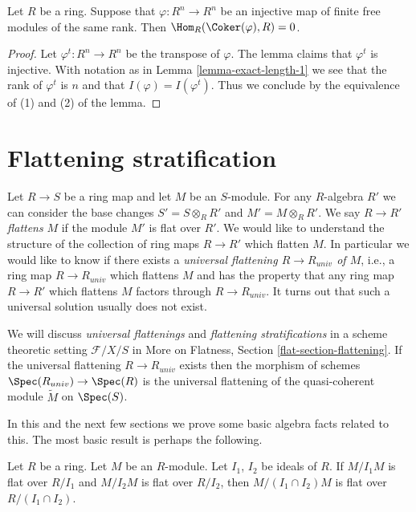 \begin{lemma}
\label{lemma-coker-injective-free}
Let $R$ be a ring. Suppose that $\varphi : R^n \to R^n$ be an injective
map of finite free modules of the same rank. Then
$\Hom_R(\Coker(\varphi), R) = 0$.
\end{lemma}

\begin{proof}
Let $\varphi^t : R^n \to R^n$ be the transpose of $\varphi$.
The lemma claims that $\varphi^t$ is injective.
With notation as in Lemma \ref{lemma-exact-length-1}
we see that the rank of $\varphi^t$ is $n$ and that
$I(\varphi) = I(\varphi^t)$. Thus we conclude by
the equivalence of (1) and (2) of the lemma.
\end{proof}









\section{Flattening stratification}
\label{section-flattening}

\noindent
Let $R \to S$ be a ring map and let $M$ be an $S$-module.
For any $R$-algebra $R'$ we can consider the base changes
$S' = S \otimes_R R'$ and $M' = M \otimes_R R'$.
We say $R \to R'$ {\it flattens} $M$ if the module $M'$ is flat over $R'$.
We would like to understand the structure of the collection of ring maps
$R \to R'$ which flatten $M$. In particular we would like to know
if there exists a {\it universal flattening $R \to R_{univ}$ of $M$},
i.e., a ring map $R \to R_{univ}$ which flattens $M$ and has the property
that any ring map $R \to R'$ which flattens $M$ factors through
$R \to R_{univ}$. It turns out that such a universal solution usually
does not exist.

\medskip\noindent
We will discuss {\it universal flattenings} and
{\it flattening stratifications} in a scheme theoretic
setting $\mathcal{F}/X/S$ in
More on Flatness, Section \ref{flat-section-flattening}.
If the universal flattening $R \to R_{univ}$ exists then the
morphism of schemes $\Spec(R_{univ}) \to \Spec(R)$ is the
universal flattening of the quasi-coherent module
$\widetilde{M}$ on $\Spec(S)$.

\medskip\noindent
In this and the next few sections we prove some basic algebra facts
related to this. The most basic result is perhaps the following.

\begin{lemma}
\label{lemma-intersection-flat}
Let $R$ be a ring. Let $M$ be an $R$-module. Let $I_1$, $I_2$ be ideals of $R$.
If $M/I_1M$ is flat over $R/I_1$ and $M/I_2M$ is flat over $R/I_2$,
then $M/(I_1 \cap I_2)M$ is flat over $R/(I_1 \cap I_2)$.
\end{lemma}

